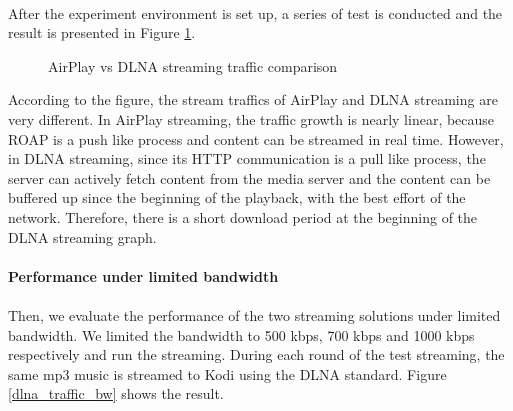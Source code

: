 \\
After the experiment environment is set up, a series of test is conducted and the result is presented in Figure \ref{airplay_vs_dlna_traffic}.
\begin{figure}
\hfill
{}
\hfill
{}
\hfill
\caption{AirPlay vs DLNA streaming traffic
comparison \label{airplay_vs_dlna_traffic}}
\end{figure}
According to the figure, the stream traffics of
AirPlay and DLNA streaming are very different. In AirPlay streaming, the traffic
growth is nearly linear, because ROAP is a push like process and content can be
streamed in real time. However, in DLNA streaming, since its HTTP communication is a pull
like process, the server can actively fetch content from the media server and the content can
be buffered  up since the beginning of the playback, with the best effort of the network.
Therefore, there is a short download period at the beginning of the DLNA
 streaming
graph. \\ 
\\
\textbf{Performance under limited bandwidth }\\
\\
Then, we evaluate the performance of  the two streaming solutions under limited bandwidth. We limited the bandwidth to 500 kbps, 700 kbps and 1000 kbps respectively and run the streaming. 
During each round of the test streaming, the same mp3 music is streamed to Kodi using the DLNA standard. Figure \ref{dlna_traffic_bw} shows the result.


